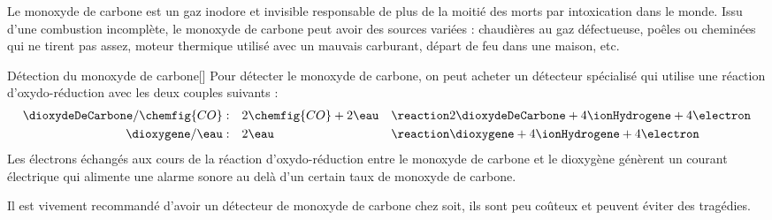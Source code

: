\label{exo:intoxication_CO}
\medskip

Le monoxyde de carbone est un gaz inodore et invisible responsable de plus de la moitié des morts par intoxication dans le monde.
Issu d'une combustion incomplète, le monoxyde de carbone peut avoir des sources variées : chaudières au gaz défectueuse, poêles ou cheminées qui ne tirent pas assez, moteur thermique utilisé avec un mauvais carburant, départ de feu dans une maison, etc.

\begin{doc}{Détection du monoxyde de carbone}[\label{doc:detection_monoxyde}]
    Pour détecter le monoxyde de carbone, on peut acheter un détecteur spécialisé qui utilise une réaction d'oxydo-réduction avec les deux couples suivants :
    \begin{alignat*}{2}
      \dioxydeDeCarbone/\chemfig{CO} : \quad
      & 2\chemfig{CO} + 2\eau 
      && \reaction 2\dioxydeDeCarbone + 4\ionHydrogene + 4\electron \\
      \dioxygene/\eau : \quad
      & 2\eau
      && \reaction \dioxygene + 4\ionHydrogene + 4\electron
    \end{alignat*}
  Les électrons échangés aux cours de la réaction d'oxydo-réduction entre le monoxyde de carbone et le dioxygène génèrent un courant électrique qui alimente une alarme sonore au delà d'un certain taux de monoxyde de carbone.

  Il est vivement recommandé d'avoir un détecteur de monoxyde de carbone chez soit, ils sont peu coûteux et peuvent éviter des tragédies.
\end{doc}





